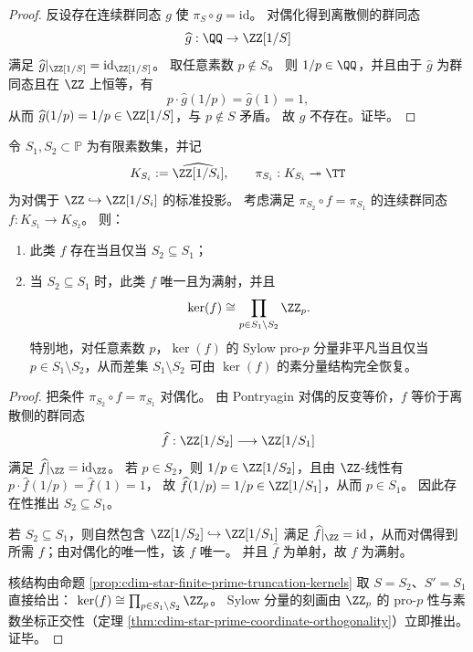 \begin{proof}
反设存在连续群同态 \(g\) 使 \(\pi_S\circ g=\mathrm{id}\)。
对偶化得到离散侧的群同态
\[
\widehat g:\QQ\to \ZZ[1/S]
\]
满足 \(\widehat g|_{\ZZ[1/S]}=\mathrm{id}_{\ZZ[1/S]}\)。
取任意素数 \(p\notin S\)。
则 \(1/p\in\QQ\)，并且由于 \(\widehat g\) 为群同态且在 \(\ZZ\) 上恒等，有
\[
p\cdot \widehat g(1/p)=\widehat g(1)=1,
\]
从而 \(\widehat g(1/p)=1/p\in \ZZ[1/S]\)，与 \(p\notin S\) 矛盾。
故 \(g\) 不存在。证毕。
\end{proof}

\begin{theorem}\label{thm:cdim-solenoid-over-t-morphism-classification}
令 \(S_1,S_2\subset\mathbb{P}\) 为有限素数集，并记
\[
K_{S_i}:=\widehat{\ZZ[1/S_i]},\qquad \pi_{S_i}:K_{S_i}\twoheadrightarrow\TT
\]
为对偶于 \(\ZZ\hookrightarrow \ZZ[1/S_i]\) 的标准投影。
考虑满足 \(\pi_{S_2}\circ f=\pi_{S_1}\) 的连续群同态 \(f:K_{S_1}\to K_{S_2}\)。
则：
\begin{enumerate}
  \item 此类 \(f\) 存在当且仅当 \(S_2\subseteq S_1\)；
  \item 当 \(S_2\subseteq S_1\) 时，此类 \(f\) 唯一且为满射，并且
  \[
  \ker(f)\cong \prod_{p\in S_1\setminus S_2}\ZZ_p.
  \]
  特别地，对任意素数 \(p\)，\(\ker(f)\) 的 Sylow pro-\(p\) 分量非平凡当且仅当 \(p\in S_1\setminus S_2\)，从而差集 \(S_1\setminus S_2\) 可由 \(\ker(f)\) 的素分量结构完全恢复。
\end{enumerate}
\end{theorem}
\begin{proof}
把条件 \(\pi_{S_2}\circ f=\pi_{S_1}\) 对偶化。
由 Pontryagin 对偶的反变等价，\(f\) 等价于离散侧的群同态
\[
\widehat f:\ZZ[1/S_2]\longrightarrow \ZZ[1/S_1]
\]
满足 \(\widehat f|_{\ZZ}=\mathrm{id}_{\ZZ}\)。
若 \(p\in S_2\)，则 \(1/p\in \ZZ[1/S_2]\)，且由 \(\ZZ\)-线性有
\(
p\cdot \widehat f(1/p)=\widehat f(1)=1
\)，
故 \(\widehat f(1/p)=1/p\in \ZZ[1/S_1]\)，从而 \(p\in S_1\)。
因此存在性推出 \(S_2\subseteq S_1\)。
\par
若 \(S_2\subseteq S_1\)，则自然包含 \(\ZZ[1/S_2]\hookrightarrow \ZZ[1/S_1]\) 满足 \(\widehat f|_{\ZZ}=\mathrm{id}\)，从而对偶得到所需 \(f\)；由对偶化的唯一性，该 \(f\) 唯一。
并且 \(\widehat f\) 为单射，故 \(f\) 为满射。
\par
核结构由命题 \ref{prop:cdim-star-finite-prime-truncation-kernels} 取 \(S=S_2\)、\(S'=S_1\) 直接给出：
\(
\ker(f)\cong\prod_{p\in S_1\setminus S_2}\ZZ_p
\)。
Sylow 分量的刻画由 \(\ZZ_p\) 的 pro-\(p\) 性与素数坐标正交性（定理 \ref{thm:cdim-star-prime-coordinate-orthogonality}）立即推出。证毕。
\end{proof}

